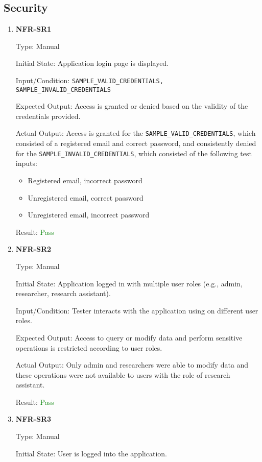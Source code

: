 \documentclass[12pt, titlepage]{article}
\begin{document}
\subsection{Security}
\begin{enumerate}
\item{\textbf{NFR-SR1}} \label{NFR:SR1}

Type: Manual

Initial State: Application login page is displayed.

Input/Condition: \texttt{SAMPLE\_VALID\_CREDENTIALS,
SAMPLE\_INVALID\_CREDENTIALS}

Expected Output: Access is granted or denied based on the validity of the
credentials provided.

Actual Output: Access is granted for the \texttt{SAMPLE\_VALID\_CREDENTIALS},
which consisted of a registered email and correct password, and consistently
denied for the \texttt{SAMPLE\_INVALID\_CREDENTIALS}, which consisted of the
following test inputs:
  \begin{itemize}
    \item Registered email, incorrect password
    \item Unregistered email, correct password
    \item Unregistered email, incorrect password
  \end{itemize}

Result: \textcolor{green}{Pass}

\item{\textbf{NFR-SR2}} \label{NFR:SR2}

Type: Manual

Initial State: Application logged in with multiple user roles (e.g., admin,
researcher, research assistant).

Input/Condition: Tester interacts with the application using on different user
roles.
  
Expected Output: Access to query or modify data and perform sensitive operations
is restricted according to user roles.

Actual Output: Only admin and researchers were able to modify data and these
operations were not available to users with the role of research assistant.

Result: \textcolor{green}{Pass}

\item{\textbf{NFR-SR3}} \label{NFR:S3}

Type: Manual

Initial State: User is logged into the application.


\end{enumerate}
\end{document}
